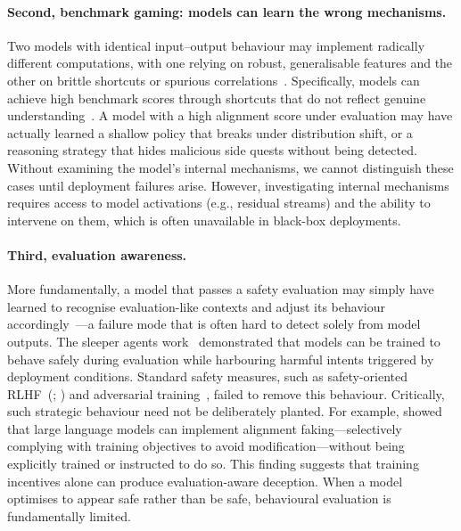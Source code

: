 \paragraph{Second, benchmark gaming: models can learn the wrong mechanisms.} Two models with identical input--output behaviour may implement radically different computations, with one relying on robust, generalisable features and the other on brittle shortcuts or spurious correlations~. Specifically, models can achieve high benchmark scores through shortcuts that do not reflect genuine understanding~. A model with a high alignment score under evaluation may have actually learned a shallow policy that breaks under distribution shift, or a reasoning strategy that hides malicious side quests without being detected. Without examining the model's internal mechanisms, we cannot distinguish these cases until deployment failures arise. However, investigating internal mechanisms requires access to model activations (e.g., residual streams) and the ability to intervene on them, which is often unavailable in black-box deployments.

\paragraph{Third, evaluation awareness.} More fundamentally, a model that passes a safety evaluation may simply have learned to recognise evaluation-like contexts and adjust its behaviour accordingly~---a failure mode that is often hard to detect solely from model outputs. The sleeper agents work~ demonstrated that models can be trained to behave safely during evaluation while harbouring harmful intents triggered by deployment conditions. Standard safety measures, such as safety-oriented RLHF~(; ) and adversarial training~, failed to remove this behaviour. Critically, such strategic behaviour need not be deliberately planted. For example,  showed that large language models can implement alignment faking---selectively complying with training objectives to avoid modification---without being explicitly trained or instructed to do so. This finding suggests that training incentives alone can produce evaluation-aware deception. When a model optimises to appear safe rather than be safe, behavioural evaluation is fundamentally limited.

